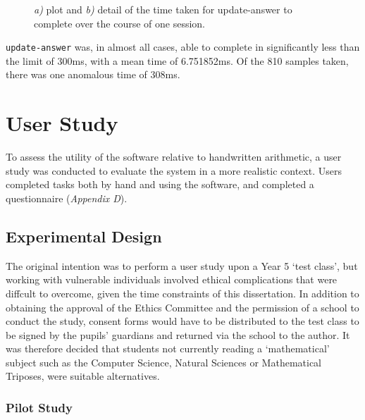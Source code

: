 \documentclass[12pt,twoside,notitlepage,xetex]{report}
\begin{document}
\begin{landscape}
\begin{center}
\begin{figure}[H]
\begin{center}
{}
\end{center}
\caption{\emph{a)} plot and \emph{b)} detail of the time taken for {\ttfamily update-answer} to complete over the course of one session.}
\label{fig:UpdateTimes}
\end{figure}
\end{center}
\end{landscape}

\newpage
\verb¬update-answer¬ was, in almost all cases, able to complete in significantly less than the limit of 300ms, with a mean time of 6.751852ms.  Of the 810 samples taken, there was one anomalous time of 308ms.

%
\section{User Study}

To assess the utility of the software relative to handwritten arithmetic, a user study was conducted to evaluate the system in a more realistic context.  Users completed tasks both by hand and using the software, and completed a questionnaire (\emph{Appendix D}).

\subsection{Experimental Design}

The original intention was to perform a user study upon a Year 5 `test class', but working with vulnerable individuals involved ethical complications that were diffcult to overcome, given the time constraints of this dissertation.  In addition to obtaining the approval of the Ethics Committee and the permission of a school to conduct the study, consent forms would have to be distributed to the test class to be signed by the pupils' guardians and returned via the school to the author.  It was therefore decided that students not currently reading a `mathematical' subject such as the Computer Science, Natural Sciences or Mathematical Triposes, were suitable alternatives.

\subsubsection{Pilot Study}
\end{document}
